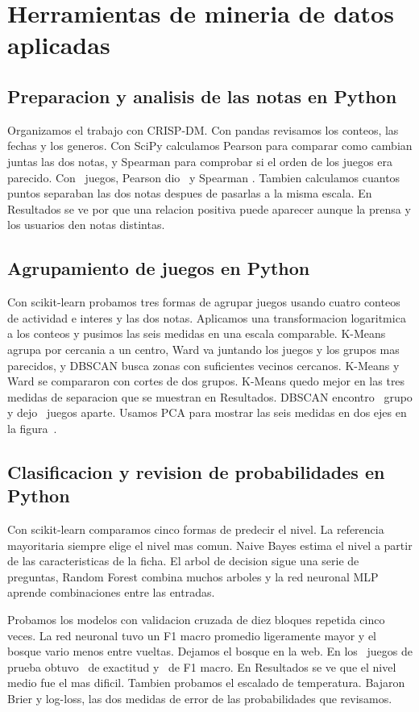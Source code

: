 \section{Herramientas de mineria de datos aplicadas}
\subsection{Preparacion y analisis de las notas en Python}
Organizamos el trabajo con CRISP-DM. Con pandas revisamos los conteos, las fechas y los generos. Con SciPy calculamos Pearson para comparar como cambian juntas las dos notas, y Spearman para comprobar si el orden de los juegos era parecido. Con \Pares\ juegos, Pearson dio \PearsonGlobal\ y Spearman \SpearmanGlobal. Tambien calculamos cuantos puntos separaban las dos notas despues de pasarlas a la misma escala. En Resultados se ve por que una relacion positiva puede aparecer aunque la prensa y los usuarios den notas distintas.

\subsection{Agrupamiento de juegos en Python}
Con scikit-learn probamos tres formas de agrupar juegos usando cuatro conteos de actividad e interes y las dos notas. Aplicamos una transformacion logaritmica a los conteos y pusimos las seis medidas en una escala comparable. K-Means agrupa por cercania a un centro, Ward va juntando los juegos y los grupos mas parecidos, y DBSCAN busca zonas con suficientes vecinos cercanos. K-Means y Ward se compararon con cortes de dos grupos. K-Means quedo mejor en las tres medidas de separacion que se muestran en Resultados. DBSCAN encontro \GruposDbscan\ grupo y dejo \RuidoDbscan\ juegos aparte. Usamos PCA para mostrar las seis medidas en dos ejes en la figura~.

\subsection{Clasificacion y revision de probabilidades en Python}
Con scikit-learn comparamos cinco formas de predecir el nivel. La referencia mayoritaria siempre elige el nivel mas comun. Naive Bayes estima el nivel a partir de las caracteristicas de la ficha. El arbol de decision sigue una serie de preguntas, Random Forest combina muchos arboles y la red neuronal MLP aprende combinaciones entre las entradas.

Probamos los modelos con validacion cruzada de diez bloques repetida cinco veces. La red neuronal tuvo un F1 macro promedio ligeramente mayor y el bosque vario menos entre vueltas. Dejamos el bosque en la web. En los \JuegosPrueba\ juegos de prueba obtuvo \ExactitudPrueba\ de exactitud y \FPrueba\ de F1 macro. En Resultados se ve que el nivel medio fue el mas dificil. Tambien probamos el escalado de temperatura. Bajaron Brier y log-loss, las dos medidas de error de las probabilidades que revisamos.

